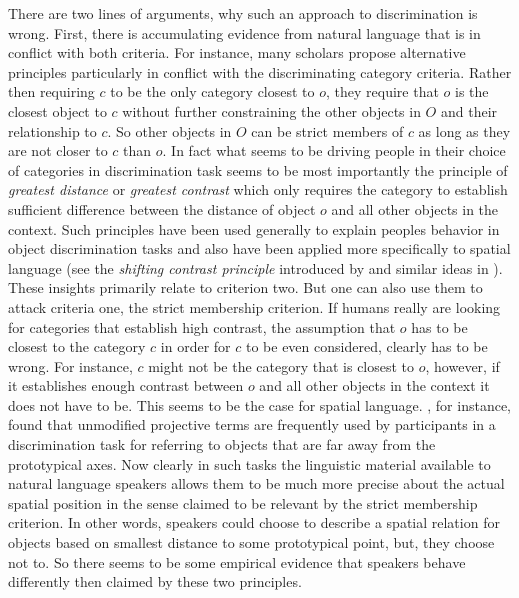 There are two lines of arguments, why such an approach to discrimination
is wrong. First, there is accumulating evidence from natural language that
is in conflict with both criteria. For instance, many scholars propose
alternative principles particularly in conflict with the discriminating 
category criteria. Rather then requiring $c$ to be the only category 
closest to $o$, they require that $o$ is the closest object to $c$ 
without further constraining the other objects in $O$ and their relationship
to $c$. So other objects in $O$ can be strict members of $c$ as long as they
are not closer to $c$ than $o$. In fact what seems to be driving
people in their choice of categories in discrimination task seems to be most
importantly the principle of \emph{greatest distance} or \emph{greatest 
contrast}  
which only requires the category to establish sufficient difference
between the distance of object $o$ and all other objects in the context.
Such principles have been used generally to explain peoples behavior in 
object discrimination tasks \citep{hermann1976objektbenennung}
and also have been applied more specifically to spatial language 
(see the \emph{shifting contrast principle} introduced by 
\citealp{herskovits1986language} and similar ideas in \citealp{freksa1999links}).
These insights primarily relate to criterion two. But one can also use them 
to attack criteria one, the strict membership criterion. If  humans really
are looking for categories that establish high contrast, the assumption
that $o$ has to be closest to the category $c$ in order for $c$ to be
even considered, clearly has to be wrong. For instance, $c$ might not
be the category that is closest to $o$, however, if it establishes enough 
contrast between $o$ and all other objects in the context it does not 
have to be. This seems to be the case for spatial language. 
\cite{tenbrink2005identifying}, for instance, found that unmodified 
projective terms are frequently used by participants in a discrimination task
for referring to objects that are far away from the prototypical axes. Now clearly
in such tasks the linguistic material available to natural language speakers 
allows them to be much more precise about the actual spatial position
in the sense claimed to be relevant by the strict membership criterion.
In other words, speakers could choose to describe a spatial relation 
for objects based on smallest distance to some prototypical point, but, they
choose not to. So there seems to be some empirical evidence that
speakers behave differently then claimed by these two principles.

